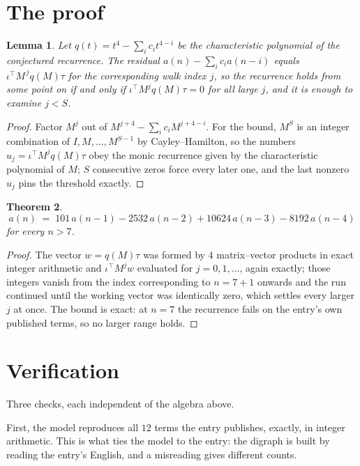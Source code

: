 \documentclass[11pt,a4paper]{article}
\theoremstyle{plain}
\newtheorem{theorem}{Theorem}
\newtheorem{lemma}[theorem]{Lemma}
\theoremstyle{definition}
\begin{document}
\section{The proof}

\begin{lemma}\label{lem:crit}
Let $q(t)=t^{4}-\sum_i c_it^{4-i}$ be the characteristic polynomial of the
conjectured recurrence. The residual $a(n)-\sum_ic_ia(n-i)$ equals
$\iota^{\!\top}M^{\,j}q(M)\tau$ for the corresponding walk index $j$, so the recurrence
holds from some point on if and only if $\iota^{\!\top}M^{j}q(M)\tau=0$ for all large $j$,
and it is enough to examine $j<S$.
\end{lemma}

\begin{proof}
Factor $M^{j}$ out of $M^{j+4}-\sum_ic_iM^{j+4-i}$. For the bound, $M^{S}$
is an integer combination of $I,M,\dots,M^{S-1}$ by Cayley--Hamilton, so the numbers
$u_j=\iota^{\!\top}M^{j}q(M)\tau$ obey the monic recurrence given by the characteristic
polynomial of $M$; $S$ consecutive zeros force every later one, and the last nonzero $u_j$
pins the threshold exactly.
\end{proof}

\begin{theorem}
\[
a(n)\;=\;101\,a(n-1) - 2532\,a(n-2) + 10624\,a(n-3) - 8192\,a(n-4)
\]
for every $n>7$.
\end{theorem}

\begin{proof}
The vector $w=q(M)\tau$ was formed by $4$ matrix--vector products in exact integer
arithmetic and $\iota^{\!\top}M^{j}w$ evaluated for $j=0,1,\dots$, again exactly; those
integers vanish from the index corresponding to $n=7+1$ onwards and the run continued
until the working vector was identically zero, which settles every larger $j$ at once. The bound is exact: at $n=7$ the recurrence fails on the entry's own published terms, so no larger range holds.
\end{proof}

\section{Verification}

Three checks, each independent of the algebra above.

First, the model reproduces all $12$ terms the entry publishes, exactly, in integer
arithmetic. This is what ties the model to the entry: the digraph is built by reading the
entry's English, and a misreading gives different counts.
\end{document}
